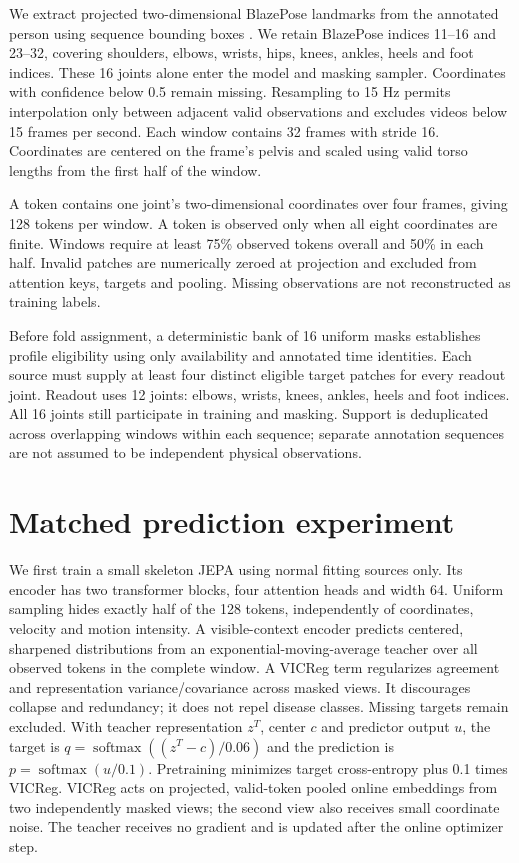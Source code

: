 \documentclass[letterpaper]{article}
\begin{document}
We extract projected two-dimensional BlazePose landmarks from the annotated person using sequence bounding boxes \citep{bazarevsky2020blazepose}. We retain BlazePose indices 11--16 and 23--32, covering shoulders, elbows, wrists, hips, knees, ankles, heels and foot indices. These 16 joints alone enter the model and masking sampler. Coordinates with confidence below 0.5 remain missing. Resampling to 15 Hz permits interpolation only between adjacent valid observations and excludes videos below 15 frames per second. Each window contains 32 frames with stride 16. Coordinates are centered on the frame's pelvis and scaled using valid torso lengths from the first half of the window.

A token contains one joint's two-dimensional coordinates over four frames, giving 128 tokens per window. A token is observed only when all eight coordinates are finite. Windows require at least 75\% observed tokens overall and 50\% in each half. Invalid patches are numerically zeroed at projection and excluded from attention keys, targets and pooling. Missing observations are not reconstructed as training labels.

Before fold assignment, a deterministic bank of 16 uniform masks establishes profile eligibility using only availability and annotated time identities. Each source must supply at least four distinct eligible target patches for every readout joint. Readout uses 12 joints: elbows, wrists, knees, ankles, heels and foot indices. All 16 joints still participate in training and masking. Support is deduplicated across overlapping windows within each sequence; separate annotation sequences are not assumed to be independent physical observations.

\section{Matched prediction experiment}

We first train a small skeleton JEPA using normal fitting sources only. Its encoder has two transformer blocks, four attention heads and width 64. Uniform sampling hides exactly half of the 128 tokens, independently of coordinates, velocity and motion intensity. A visible-context encoder predicts centered, sharpened distributions from an exponential-moving-average teacher over all observed tokens in the complete window. A VICReg term regularizes agreement and representation variance/covariance across masked views. It discourages collapse and redundancy; it does not repel disease classes. Missing targets remain excluded. With teacher representation \(z^T\), center \(c\) and predictor output \(u\), the target is \(q=\operatorname{softmax}((z^T-c)/0.06)\) and the prediction is \(p=\operatorname{softmax}(u/0.1)\). Pretraining minimizes target cross-entropy plus 0.1 times VICReg. VICReg acts on projected, valid-token pooled online embeddings from two independently masked views; the second view also receives small coordinate noise. The teacher receives no gradient and is updated after the online optimizer step.
\end{document}
